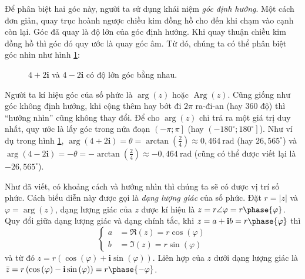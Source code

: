 \documentclass[a4paper, titlepage, openany]{book}
\DeclareMathOperator{\Arg}{Arg}
\newcommand\dblquote[1]{\textquotedblleft #1\textquotedblright}
\numberwithin{equation}{chapter}
\begin{document}
Để phân biệt hai góc này, người ta sử dụng khái niệm \emph{góc định hướng}. Một cách đơn giản, quay trục hoành ngược chiều kim đồng hồ cho đến khi chạm vào cạnh còn lại. Góc đã quay là độ lớn của góc định hướng. Khi quay thuận chiều kim đồng hồ thì góc đó quy ước là quay góc âm. Từ đó, chúng ta có thể phân biệt góc nhìn như hình \ref{fig:hai_truong_hop_goc_dinh_huong}:

\begin{figure}[h]
   \centering
   \caption{$4+2\mathbf{i}$ và $4-2\mathbf{i}$ có độ lớn góc bằng nhau.}
   \label{fig:hai_truong_hop_goc_dinh_huong}
\end{figure}

Người ta kí hiệu góc của số phức là $\arg{(z)}$ hoặc $\Arg{(z)}$. Cũng giống như góc không định hướng, khi cộng thêm hay bớt đi $2\pi$ ra-đi-an (hay $360$ độ) thì \dblquote{hướng nhìn} cũng không thay đổi. Để cho $\arg{(z)}$ chỉ trả ra một giá trị duy nhất, quy ước là lấy góc trong nửa đoạn $\left(-\pi;\pi\right]$ (hay $\left(-180^\circ;180^\circ\right]$). Như ví dụ trong hình \ref{fig:hai_truong_hop_goc_dinh_huong}, $\arg{(4+2\mathbf{i})} = \theta = \arctan\left(\frac{2}{4}\right) \approx 0,464~\text{rad}$ (hay $26,565^\circ$) và $\arg{(4-2\mathbf{i})} = -\theta = -\arctan\left(\frac{2}{4}\right) \approx -0,464~\text{rad}$ (cũng có thể được viết lại là $-26,565^\circ$).

Như đã viết, có khoảng cách và hướng nhìn thì chúng ta sẽ có được vị trí số phức. Cách biểu diễn này được gọi là \emph{dạng lượng giác} của số phức. Đặt $r = |z|$ và $\varphi = \arg{(z)}$, dạng lượng giác của $z$ được kí hiệu là $z = r \angle \varphi = r \phase{\varphi}$. Quy đổi giữa dạng lượng giác và dạng chính tắc, khi $z = a + \mathbf{i}b = r \phase{\varphi}$ thì
\[
\left\{
\begin{aligned}
   a &= \Re{(z)} = r \cos{(\varphi)} \\ 
   b &= \Im{(z)} = r \sin{(\varphi)}
\end{aligned}
\right.
\]
và từ đó $z = r\left(\cos{(\varphi)} + \mathbf{i}\sin{(\varphi)}\right)$. Liên hợp của $z$ dưới dạng lượng giác là $\bar{z} = r\left(\cos{(\varphi)} - \mathbf{i}\sin{(\varphi)}\right) = r \phase{-\varphi}$.
\end{document}
